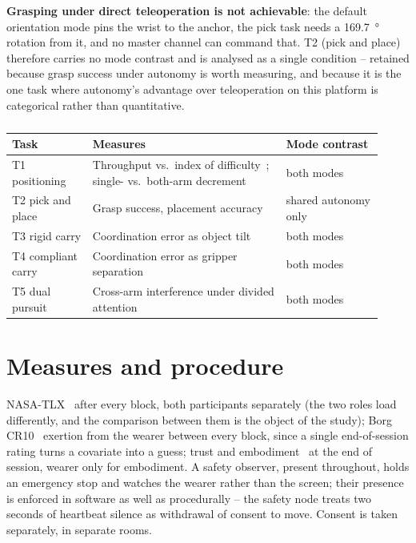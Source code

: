 \textbf{Grasping under direct teleoperation is not achievable}: the default
orientation mode pins the wrist to the anchor, the pick task needs a
\SI{169.7}{\degree} rotation from it, and no master channel can command
that. T2 (pick and place) therefore carries no mode contrast and is analysed
as a single condition -- retained because grasp success under autonomy is
worth measuring, and because it is the one task where autonomy's advantage
over teleoperation on this platform is categorical rather than quantitative.

\begin{table}[htbp]
  \centering
  \small
  \caption[Task set]{}
  \label{tab:taskset}
  \begin{tabular}{@{}p{0.20\linewidth}p{0.48\linewidth}p{0.24\linewidth}@{}}
    \toprule
    Task & Measures & Mode contrast \\
    \midrule
    T1 positioning & Throughput vs.\ index of difficulty~\cite{fitts1954information}; single- vs.\ both-arm decrement & both modes \\
    T2 pick and place & Grasp success, placement accuracy & shared autonomy only \\
    T3 rigid carry & Coordination error as object tilt & both modes \\
    T4 compliant carry & Coordination error as gripper separation & both modes \\
    T5 dual pursuit & Cross-arm interference under divided attention & both modes \\
    \bottomrule
  \end{tabular}
\end{table}

\section{Measures and procedure}

NASA-TLX~\cite{hart1988nasatlx} after every block, both participants
separately (the two roles load differently, and the comparison between them
is the object of the study); Borg CR10~\cite{borg1982perceived} exertion from
the wearer between every block, since a single end-of-session rating turns a
covariate into a guess; trust and embodiment~\cite{longo2008embodiment} at
the end of session, wearer only for embodiment. A safety observer, present
throughout, holds an emergency stop and watches the wearer rather than the
screen; their presence is enforced in software as well as procedurally --
the safety node treats two seconds of heartbeat silence as withdrawal of
consent to move. Consent is taken separately, in separate rooms.


